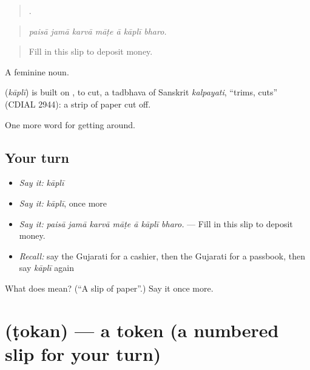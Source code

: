\begin{quote}
      .
\end{quote}

\begin{quote}
\emph{paisā jamā karvā māṭe ā kāplī bharo.}
\end{quote}

\begin{quote}
Fill in this slip to deposit money.
\end{quote}

A feminine noun.

\begin{cousinweb}
\textbf{} (\emph{kāplī}) is built on , to cut, a tadbhava of Sanskrit \emph{kalpayati}, \textquotedblleft{}trims, cuts\textquotedblright{} (CDIAL 2944): a strip of paper cut off.
\end{cousinweb}

\begin{grammarlens}[title={What you've built}]
One more word for getting around.
\end{grammarlens}

\subsection*{Your turn}
\begin{itemize}
\raggedright
  \item \emph{Say it:} \emph{kāplī}
  \item \emph{Say it:} \emph{kāplī}, once more
  \item \emph{Say it:} \emph{paisā jamā karvā māṭe ā kāplī bharo.} — Fill in this slip to deposit money.
  \item \emph{Recall:} say the Gujarati for a cashier, then the Gujarati for a passbook, then say \emph{kāplī} again
\end{itemize}

\begin{tcolorbox}[breakable,colback=teal!4,colframe=teal!35!black,title={Before you move on}]
What does  mean? (\textquotedblleft{}A slip of paper\textquotedblright{}.) Say it once more.
\end{tcolorbox}
\section[\texorpdfstring{\gu{ટોકન} (ṭokan)}{ટોકન (ṭokan)}]{ (ṭokan) — a token (a numbered slip for your turn)}

